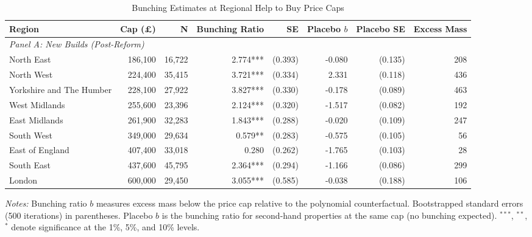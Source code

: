 \begin{table}[htbp]
\centering
\caption{Bunching Estimates at Regional Help to Buy Price Caps}
\label{tab:bunching}
\begin{adjustbox}{max width=\textwidth}
\begin{tabular}{lrrrrrrr}
\hline\hline
Region & Cap (\pounds) & N & Bunching Ratio & SE & Placebo $b$ & Placebo SE & Excess Mass \\
\hline
\multicolumn{8}{l}{\textit{Panel A: New Builds (Post-Reform)}} \\
North East & 186,100 & 16,722 & 2.774*** & (0.393) & -0.080 & (0.135) & 208 \\
North West & 224,400 & 35,415 & 3.721*** & (0.334) & 2.331 & (0.118) & 436 \\
Yorkshire and The Humber & 228,100 & 27,922 & 3.827*** & (0.330) & -0.178 & (0.089) & 463 \\
West Midlands & 255,600 & 23,396 & 2.124*** & (0.320) & -1.517 & (0.082) & 192 \\
East Midlands & 261,900 & 32,283 & 1.843*** & (0.288) & -0.020 & (0.109) & 247 \\
South West & 349,000 & 29,634 & 0.579** & (0.283) & -0.575 & (0.105) & 56 \\
East of England & 407,400 & 33,018 & 0.280 & (0.262) & -1.765 & (0.103) & 28 \\
South East & 437,600 & 45,795 & 2.364*** & (0.294) & -1.166 & (0.086) & 299 \\
London & 600,000 & 29,450 & 3.055*** & (0.585) & -0.038 & (0.188) & 106 \\
\hline\hline
\end{tabular}
\end{adjustbox}
\begin{minipage}{\textwidth}
\footnotesize \textit{Notes:} Bunching ratio $b$ measures excess mass below the price cap relative to the polynomial counterfactual. Bootstrapped standard errors (500 iterations) in parentheses. Placebo $b$ is the bunching ratio for second-hand properties at the same cap (no bunching expected). $^{***}$, $^{**}$, $^{*}$ denote significance at the 1\%, 5\%, and 10\% levels.
\end{minipage}
\end{table}

